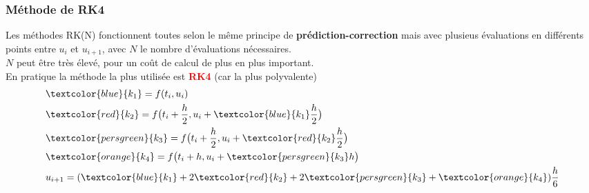 \documentclass{beamer}
\begin{document}
\begin{frame}
\frametitle{Méthode de RK4}
Les méthodes RK(N) fonctionnent toutes selon le même principe de \textbf{prédiction-correction} mais avec plusieus évaluations en différents points entre $u_i$ et $u_{i+1}$, avec $N$ le nombre d'évaluations nécessaires.\\
\vspace{0.3cm}
$N$ peut être très élevé, pour un coût de calcul de plus en plus important.\\
En pratique la méthode la plus utilisée est \textbf{\textcolor{red}{RK4}} (car la plus polyvalente)\\
\vspace{-0.4cm}
\begin{align*}
& \textcolor{blue}{k_1} = f(t_i, u_i) \\
& \textcolor{red}{k_2} = f\big( t_i + \frac{h}{2}, u_i + \textcolor{blue}{k_1}\frac{h}{2} \big)\\
& \textcolor{persgreen}{k_3} = f\big( t_i + \frac{h}{2}, u_i + \textcolor{red}{k_2}\frac{h}{2} \big)\\
& \textcolor{orange}{k_4} = f\big( t_i + h, u_i + \textcolor{persgreen}{k_3}h \big)\\
& u_{i+1} =(\textcolor{blue}{k_1} + 2\textcolor{red}{k_2} + 2\textcolor{persgreen}{k_3} + \textcolor{orange}{k_4})\frac{h}{6}
\end{align*}

\end{frame}
\end{document}
